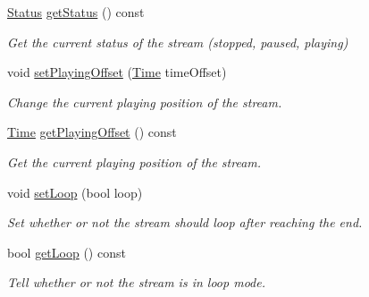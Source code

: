 \begin{DoxyCompactItemize}
\hyperlink{classsf_1_1_sound_source_ac43af72c98c077500b239bc75b812f03}{Status} \hyperlink{classsf_1_1_sound_stream_a75f722e7edcfa9952ff0c643966c6858}{get\+Status} () const 
\begin{DoxyCompactList}\small\item\em Get the current status of the stream (stopped, paused, playing) \end{DoxyCompactList}\item 
void \hyperlink{classsf_1_1_sound_stream_af416a5f84c8750d2acb9821d78bc8646}{set\+Playing\+Offset} (\hyperlink{classsf_1_1_time}{Time} time\+Offset)
\begin{DoxyCompactList}\small\item\em Change the current playing position of the stream. \end{DoxyCompactList}\item 
\hyperlink{classsf_1_1_time}{Time} \hyperlink{classsf_1_1_sound_stream_a6070416e1e1a11b5915e9314dd6638f7}{get\+Playing\+Offset} () const 
\begin{DoxyCompactList}\small\item\em Get the current playing position of the stream. \end{DoxyCompactList}\item 
void \hyperlink{classsf_1_1_sound_stream_a43fade018ffba7e4f847a9f00b353f3d}{set\+Loop} (bool loop)
\begin{DoxyCompactList}\small\item\em Set whether or not the stream should loop after reaching the end. \end{DoxyCompactList}\item 
bool \hyperlink{classsf_1_1_sound_stream_ad8bbf6c0d2ff2d75e19035dea3fd77c3}{get\+Loop} () const 
\begin{DoxyCompactList}\small\item\em Tell whether or not the stream is in loop mode. \end{DoxyCompactList}\end{DoxyCompactItemize}
